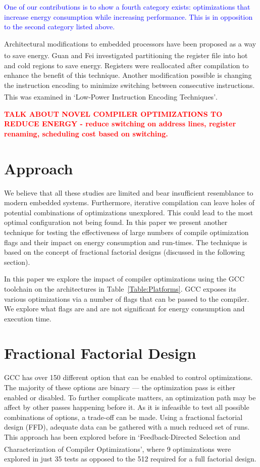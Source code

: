 \documentclass[twocolumn]{article}
\newcommand{\todo}[1]{\textbf{\textcolor{red}{#1}}}
\let\oldcite\cite
\renewcommand{\cite}[1]{\textsuperscript{\oldcite{#1}}}
\begin{document}
\textcolor{blue}{One of our contributions is to show a fourth category exists: optimizations that increase energy consumption while increasing performance. This is in opposition to the second category listed above.}

Architectural modifications to embedded processors have been proposed as a way to save energy. Guan and Fei investigated partitioning the register file\cite{RegisterFilePartitioning} into hot and cold regions to save energy. Registers were reallocated after compilation to enhance the benefit of this technique. Another modification possible is changing the instruction encoding to minimize switching between consecutive instructions. This was examined in `Low-Power Instruction Encoding Techniques'\cite{LowPowerInstructionEncodings}.

\todo{TALK ABOUT NOVEL COMPILER OPTIMIZATIONS TO REDUCE ENERGY - reduce switching on address lines, register renaming, scheduling cost based on switching.}


\section*{Approach}

We believe that all these studies are limited and bear insufficient resemblance to modern embedded systems. Furthermore, iterative compilation can leave holes of potential combinations of optimizations unexplored. This could lead to the most optimal configuration not being found. In this paper we present another technique for testing the effectiveness of large numbers of compile optimization flags and their impact on energy consumption and run-times. The technique is based on the concept of fractional factorial designs (discussed in the following section).

In this paper we explore the impact of compiler optimizations using the GCC toolchain on the architectures in Table~\ref{Table:Platforms}. GCC exposes its various optimizations via a number of flags that can be passed to the compiler. We explore what flags are and are not significant for energy consumption and execution time.

\section*{Fractional Factorial Design}

GCC has over 150 different option that can be enabled to control optimizations. The majority of these options are binary --- the optimization pass is either enabled or disabled. To further complicate matters, an optimization path may be affect by other passes happening before it. As it is infeasible to test all possible combinations of options, a trade-off can be made. Using a fractional factorial design (FFD), adequate data can be gathered with a much reduced set of runs. This approach has been explored before in `Feedback-Directed Selection and Characterization of Compiler Optimizations'\cite{IntelPaper}, where 9 optimizations were explored in just 35 tests as opposed to the 512 required for a full factorial design.
\end{document}
